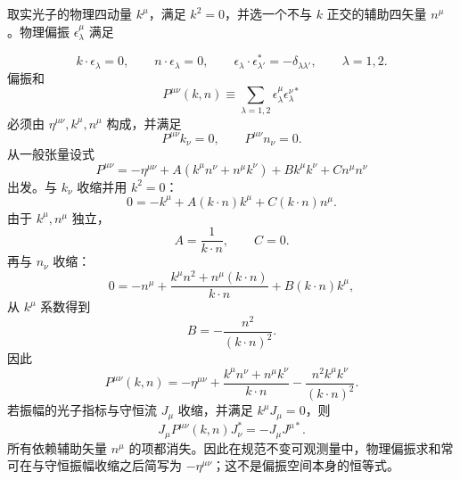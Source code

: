 \begin{derivation}
取实光子的物理四动量 $k^\mu$，满足 $k^2=0$，并选一个不与 $k$ 正交的辅助四矢量 $n^\mu$。物理偏振 $\epsilon_\lambda^\mu$ 满足

\begin{equation*}
 k\!\cdot\epsilon_\lambda=0,
 \qquad
 n\!\cdot\epsilon_\lambda=0,
 \qquad
 \epsilon_\lambda\!\cdot\epsilon_{\lambda'}^*=-\delta_{\lambda\lambda'},
 \qquad \lambda=1,2.
\end{equation*}
偏振和
\begin{equation*}
 P^{\mu\nu}(k,n)
 \equiv\sum_{\lambda=1,2}
 \epsilon_\lambda^\mu\epsilon_\lambda^{\nu*}
\end{equation*}
必须由 $\eta^{\mu\nu},k^\mu,n^\mu$ 构成，并满足
\begin{equation*}
 P^{\mu\nu}k_\nu=0,
 \qquad
 P^{\mu\nu}n_\nu=0.
\end{equation*}
从一般张量设式
\begin{equation*}
 P^{\mu\nu}
 =-\eta^{\mu\nu}
 +A(k^\mu n^\nu+n^\mu k^\nu)
 +B k^\mu k^\nu
 +C n^\mu n^\nu
\end{equation*}
出发。与 $k_\nu$ 收缩并用 $k^2=0$：
\begin{equation*}
 0=-k^\mu+A(k\!\cdot n)k^\mu+C(k\!\cdot n)n^\mu.
\end{equation*}
由于 $k^\mu,n^\mu$ 独立，
\begin{equation*}
 A=\frac1{k\!\cdot n},
 \qquad C=0.
\end{equation*}
再与 $n_\nu$ 收缩：
\begin{equation*}
 0=-n^\mu+\frac{k^\mu n^2+n^\mu(k\!\cdot n)}{k\!\cdot n}
 +B(k\!\cdot n)k^\mu,
\end{equation*}
从 $k^\mu$ 系数得到
\begin{equation*}
 B=-\frac{n^2}{(k\!\cdot n)^2}.
\end{equation*}
因此
\begin{equation*}
 {
 P^{\mu\nu}(k,n)
 =-\eta^{\mu\nu}
 +\frac{k^\mu n^\nu+n^\mu k^\nu}{k\!\cdot n}
 -\frac{n^2k^\mu k^\nu}{(k\!\cdot n)^2}.}
 \end{equation*}
若振幅的光子指标与守恒流 $J_\mu$ 收缩，并满足 $k^\mu J_\mu=0$，则
\begin{equation*}
 {
 J_\mu P^{\mu\nu}(k,n)J_\nu^*
 =-J_\mu J^{\mu*}.}
 \end{equation*}
所有依赖辅助矢量 $n^\mu$ 的项都消失。因此在规范不变可观测量中，物理偏振求和常可在与守恒振幅收缩之后简写为 $-\eta^{\mu\nu}$；这不是偏振空间本身的恒等式。
\end{derivation}

